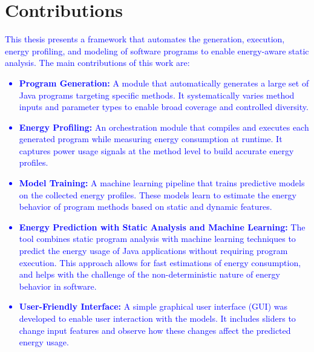 \section{Contributions}
\textcolor{blue}
{


This thesis presents a framework that automates the generation, execution, energy profiling, and modeling of software programs to enable energy-aware static analysis. The main contributions of this work are:

\begin{itemize}
    \item \textbf{Program Generation:} A module that automatically generates a large set of Java programs targeting specific methods. It systematically varies method inputs and parameter types to enable broad coverage and controlled diversity.

    \item \textbf{Energy Profiling:} An orchestration module that compiles and executes each generated program while measuring energy consumption at runtime. It captures power usage signals at the method level to build accurate energy profiles.

    \item \textbf{Model Training:} A machine learning pipeline that trains predictive models on the collected energy profiles. These models learn to estimate the energy behavior of program methods based on static and dynamic features.
    
    \item \textbf{Energy Prediction with Static Analysis and Machine Learning:} The tool combines static program analysis with machine learning techniques to predict the energy usage of Java applications without requiring program execution. This approach allows for fast estimations of energy consumption, and helps with the challenge of the non-deterministic nature of energy behavior in software.

    \item \textbf{User-Friendly Interface:} A simple graphical user interface (GUI) was developed to enable user interaction with the models. It includes sliders to change input features and observe how these changes affect the predicted energy usage.
    

\end{itemize}}

